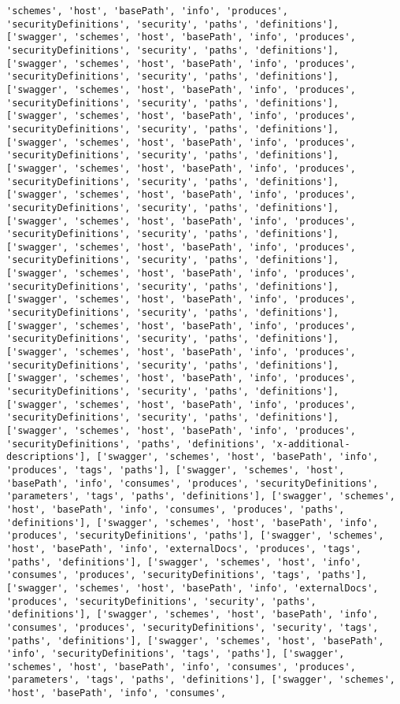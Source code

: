 \documentclass[11pt]{article}
\begin{document}
\begin{Verbatim}[commandchars=\\\{\}]
'schemes', 'host', 'basePath', 'info', 'produces', 'securityDefinitions', 'security', 'paths', 'definitions'], ['swagger', 'schemes', 'host', 'basePath', 'info', 'produces', 'securityDefinitions', 'security', 'paths', 'definitions'], ['swagger', 'schemes', 'host', 'basePath', 'info', 'produces', 'securityDefinitions', 'security', 'paths', 'definitions'], ['swagger', 'schemes', 'host', 'basePath', 'info', 'produces', 'securityDefinitions', 'security', 'paths', 'definitions'], ['swagger', 'schemes', 'host', 'basePath', 'info', 'produces', 'securityDefinitions', 'security', 'paths', 'definitions'], ['swagger', 'schemes', 'host', 'basePath', 'info', 'produces', 'securityDefinitions', 'security', 'paths', 'definitions'], ['swagger', 'schemes', 'host', 'basePath', 'info', 'produces', 'securityDefinitions', 'security', 'paths', 'definitions'], ['swagger', 'schemes', 'host', 'basePath', 'info', 'produces', 'securityDefinitions', 'security', 'paths', 'definitions'], ['swagger', 'schemes', 'host', 'basePath', 'info', 'produces', 'securityDefinitions', 'security', 'paths', 'definitions'], ['swagger', 'schemes', 'host', 'basePath', 'info', 'produces', 'securityDefinitions', 'security', 'paths', 'definitions'], ['swagger', 'schemes', 'host', 'basePath', 'info', 'produces', 'securityDefinitions', 'security', 'paths', 'definitions'], ['swagger', 'schemes', 'host', 'basePath', 'info', 'produces', 'securityDefinitions', 'security', 'paths', 'definitions'], ['swagger', 'schemes', 'host', 'basePath', 'info', 'produces', 'securityDefinitions', 'security', 'paths', 'definitions'], ['swagger', 'schemes', 'host', 'basePath', 'info', 'produces', 'securityDefinitions', 'security', 'paths', 'definitions'], ['swagger', 'schemes', 'host', 'basePath', 'info', 'produces', 'securityDefinitions', 'security', 'paths', 'definitions'], ['swagger', 'schemes', 'host', 'basePath', 'info', 'produces', 'securityDefinitions', 'security', 'paths', 'definitions'], ['swagger', 'schemes', 'host', 'basePath', 'info', 'produces', 'securityDefinitions', 'paths', 'definitions', 'x-additional-descriptions'], ['swagger', 'schemes', 'host', 'basePath', 'info', 'produces', 'tags', 'paths'], ['swagger', 'schemes', 'host', 'basePath', 'info', 'consumes', 'produces', 'securityDefinitions', 'parameters', 'tags', 'paths', 'definitions'], ['swagger', 'schemes', 'host', 'basePath', 'info', 'consumes', 'produces', 'paths', 'definitions'], ['swagger', 'schemes', 'host', 'basePath', 'info', 'produces', 'securityDefinitions', 'paths'], ['swagger', 'schemes', 'host', 'basePath', 'info', 'externalDocs', 'produces', 'tags', 'paths', 'definitions'], ['swagger', 'schemes', 'host', 'info', 'consumes', 'produces', 'securityDefinitions', 'tags', 'paths'], ['swagger', 'schemes', 'host', 'basePath', 'info', 'externalDocs', 'produces', 'securityDefinitions', 'security', 'paths', 'definitions'], ['swagger', 'schemes', 'host', 'basePath', 'info', 'consumes', 'produces', 'securityDefinitions', 'security', 'tags', 'paths', 'definitions'], ['swagger', 'schemes', 'host', 'basePath', 'info', 'securityDefinitions', 'tags', 'paths'], ['swagger', 'schemes', 'host', 'basePath', 'info', 'consumes', 'produces', 'parameters', 'tags', 'paths', 'definitions'], ['swagger', 'schemes', 'host', 'basePath', 'info', 'consumes', 
\end{Verbatim}
\end{document}
